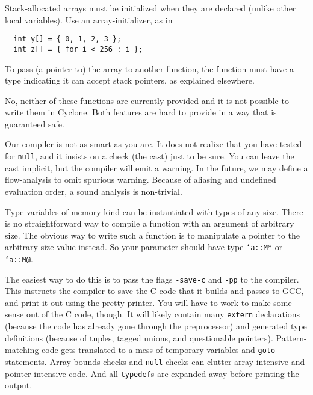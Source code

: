 Stack-allocated arrays must be initialized when they are declared
(unlike other local variables).  Use an array-initializer, as in
\begin{verbatim}
  int y[] = { 0, 1, 2, 3 };
  int z[] = { for i < 256 : i };
\end{verbatim}

To pass (a pointer to) the array to another function, the function
must have a type indicating it can accept stack pointers, as explained
elsewhere.


No, neither of these functions are currently provided and it is not
possible to write them in Cyclone.  Both features are hard to provide
in a way that is guaranteed safe.


Our compiler is not as smart as you are.  It does not realize that you
have tested for \texttt{null}, and it insists on a check (the cast)
just to be sure.  You can leave the cast implicit, but the compiler
will emit a warning.  In the future, we may define a flow-analysis to
omit spurious warning.  Because of aliasing and undefined evaluation
order, a sound analysis is non-trivial.


Type variables of memory kind can be instantiated with types of any
size.  There is no straightforward way to compile a function with an
argument of arbitrary size.  The obvious way to write such a function
is to manipulate a pointer to the arbitrary size value instead.  So
your parameter should have type \texttt{`a::M*} or \texttt{`a::M@}.


The easiest way to do this is to pass the flags \texttt{-save-c} and
\texttt{-pp} to the compiler.  This instructs the compiler to save the
C code that it builds and passes to GCC, and print it out using the
pretty-printer.  You will have to work to make some sense out of the C
code, though.  It will likely contain many \texttt{extern}
declarations (because the code has already gone through the
preprocessor) and generated type definitions (because of tuples,
tagged unions, and questionable pointers).  Pattern-matching code gets
translated to a mess of temporary variables and \texttt{goto}
statements.  Array-bounds checks and \texttt{null} checks can clutter
array-intensive and pointer-intensive code.  And all \texttt{typedef}s
are expanded away before printing the output.

